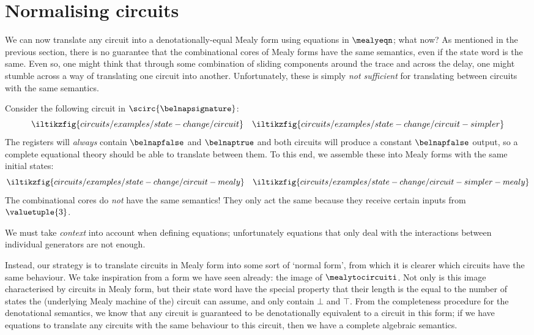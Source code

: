 \section{Normalising circuits}

We can now translate any circuit into a denotationally-equal Mealy form using
equations in \(\mealyeqn\); what now?
As mentioned in the previous section, there is no guarantee that the
combinational cores of Mealy forms have the same semantics, even if the state
word is the same.
Even so, one might think that through some combination of sliding components
around the trace and across the delay, one might stumble across a way of
translating one circuit into another.
Unfortunately, these is simply \emph{not sufficient} for
translating between circuits with the same semantics.

\begin{example}
    Consider the following circuit in \(\scirc{\belnapsignature}\): \[
        \iltikzfig{circuits/examples/state-change/circuit}
        \quad
        \iltikzfig{circuits/examples/state-change/circuit-simpler}
    \]
    The registers will \emph{always} contain
    \(\belnapfalse\) and \(\belnaptrue\) and both circuits will
    produce a constant \(\belnapfalse\) output, so a complete equational theory
    should be able to translate between them.
    To this end, we assemble these into Mealy forms with the same initial states:
    \[
        \iltikzfig{circuits/examples/state-change/circuit-mealy}
        \quad
        \iltikzfig{circuits/examples/state-change/circuit-simpler-mealy}
    \]
    The combinational cores do \emph{not} have the same semantics!
    They only act the same because they receive certain inputs
    from \(\valuetuple{3}\).
\end{example}

We must take \emph{context} into account when defining
equations; unfortunately equations that only deal with the interactions between
individual generators are not enough.

Instead, our strategy is to translate circuits in Mealy form into some sort of
`normal form', from which it is clearer which circuits have the same behaviour.
We take inspiration from a form we have seen already: the image of
\(\mealytocircuiti\).
Not only is this image characterised by circuits in Mealy form, but their state
word have the special property that their length is the equal to the number of
states the (underlying Mealy machine of the) circuit can assume, and only
contain \(\bot\) and \(\top\).
From the completeness procedure for the denotational semantics, we know that any
circuit is guaranteed to be denotationally equivalent to a circuit in this form;
if we have equations to translate any circuits with the same behaviour to this
circuit, then we have a complete algebraic semantics.

